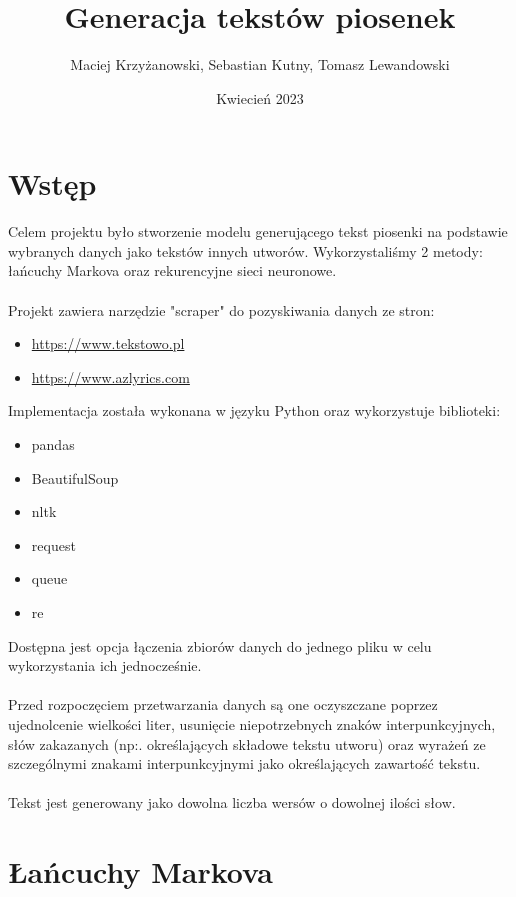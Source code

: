 \documentclass{article}
\title{Generacja tekstów piosenek}
\author{Maciej Krzyżanowski, Sebastian Kutny, Tomasz Lewandowski}
\date{Kwiecień 2023}
\begin{document}
\maketitle

\tableofcontents

\newpage
\section{Wstęp}
Celem projektu było stworzenie modelu generującego tekst piosenki na podstawie wybranych danych jako tekstów innych utworów. Wykorzystaliśmy 2 metody: łańcuchy Markova oraz rekurencyjne sieci neuronowe. \\ \\ Projekt zawiera narzędzie "scraper" do pozyskiwania danych ze stron: 
\begin{itemize}
    \item \url{https://www.tekstowo.pl}
    \item \url{https://www.azlyrics.com}
\end{itemize}
Implementacja została wykonana w języku Python oraz wykorzystuje biblioteki: 
\begin{itemize}
    \item pandas
    \item BeautifulSoup
    \item nltk
    \item request
    \item queue
    \item re
\end{itemize}
Dostępna jest opcja łączenia zbiorów danych do jednego pliku w celu wykorzystania ich jednocześnie. \\ \\
Przed rozpoczęciem przetwarzania danych są one oczyszczane poprzez ujednolcenie wielkości liter, usunięcie niepotrzebnych znaków interpunkcyjnych, słów zakazanych (np:. określających składowe tekstu utworu) oraz wyrażeń ze szczególnymi znakami interpunkcyjnymi jako określających zawartość tekstu.
\\ \\
Tekst jest generowany jako dowolna liczba wersów o dowolnej ilości słow.
\newpage
\section{Łańcuchy Markova}
\end{document}
